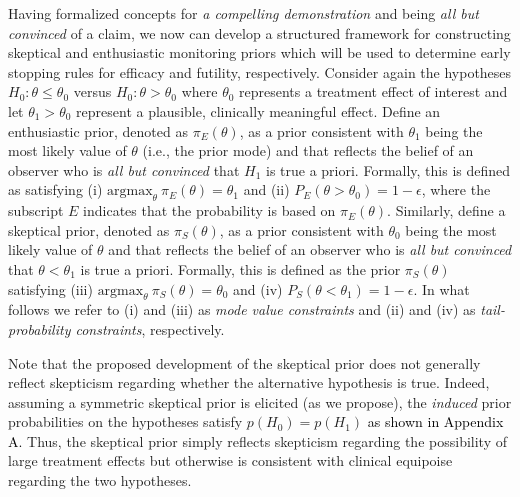 \documentclass[12pt]{article}
\begin{document}
Having formalized concepts for \textit{a compelling demonstration} and  being \textit{all but convinced} of a claim, we now can develop a structured framework for constructing skeptical and enthusiastic monitoring priors which will be used to determine early stopping rules for efficacy and futility, respectively.
%
Consider again the hypotheses $H_0: \theta \le \theta_0$ versus $H_0: \theta > \theta_0$ where $\theta_0$ represents a 
treatment effect of interest and let $\theta_1>\theta_0$ represent a plausible, clinically meaningful effect.
%
Define an enthusiastic prior, denoted as $\pi_{E}(\theta)$, as a prior consistent with $\theta_1$ being the most 
likely value of $\theta$ (i.e., the prior mode) and that reflects the belief of an observer who is 
\textit{all but convinced} that $H_1$ is true a priori. 
%
Formally, this is defined as satisfying (i) $\text{argmax}_\theta~\pi_E(\theta)=\theta_1$
and (ii) $P_E(\theta >\theta_0)=1-\epsilon$, where the subscript $E$ indicates that the probability is 
based on $\pi_{E}(\theta)$.
%
Similarly, define a skeptical prior, denoted as $\pi_{S}(\theta)$, as a prior consistent with $\theta_0$ being the most 
likely value of $\theta$ and that reflects the belief of an observer who is \textit{all but convinced} that 
$\theta <\theta_1$ is true a priori. 
%
Formally, this is defined as the prior $\pi_{S}(\theta)$ satisfying
(iii) $\text{argmax}_\theta~\pi_S(\theta)=\theta_0$  and (iv) $P_S(\theta <\theta_1)=1-\epsilon$.
%
In what follows we refer to (i) and (iii) as \textit{mode value constraints} and (ii) and (iv) as \textit{tail-probability constraints}, respectively.

Note that the proposed development of the skeptical prior does not generally reflect skepticism regarding whether the alternative hypothesis is true. 
%
Indeed, assuming a symmetric skeptical prior is elicited (as we propose), the \textit{induced} prior probabilities on the hypotheses
satisfy $p(H_0) =  p(H_1)$ \textcolor{black}{as shown in Appendix A.}
%
%
%
Thus, the skeptical prior simply reflects skepticism regarding the possibility of large treatment effects but otherwise is consistent with clinical equipoise regarding the two hypotheses.
%
\end{document}
